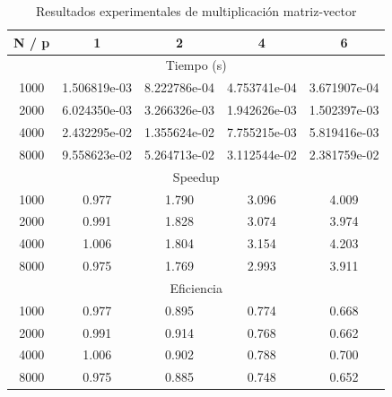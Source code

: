 \documentclass[12pt,a4paper]{article}
\begin{document}
\begin{table}[htbp]
\centering
\caption{Resultados experimentales de multiplicación matriz-vector}
\label{tab:matvec}
\begin{tabular}{ccccc}
\toprule
N / p & 1 & 2 & 4 & 6 \\
\midrule
\multicolumn{5}{c}{Tiempo (s)} \\
\midrule
1000 & 1.506819e-03 & 8.222786e-04 & 4.753741e-04 & 3.671907e-04 \\
2000 & 6.024350e-03 & 3.266326e-03 & 1.942626e-03 & 1.502397e-03 \\
4000 & 2.432295e-02 & 1.355624e-02 & 7.755215e-03 & 5.819416e-03 \\
8000 & 9.558623e-02 & 5.264713e-02 & 3.112544e-02 & 2.381759e-02 \\
\midrule
\multicolumn{5}{c}{Speedup} \\
\midrule
1000 & 0.977 & 1.790 & 3.096 & 4.009 \\
2000 & 0.991 & 1.828 & 3.074 & 3.974 \\
4000 & 1.006 & 1.804 & 3.154 & 4.203 \\
8000 & 0.975 & 1.769 & 2.993 & 3.911 \\
\midrule
\multicolumn{5}{c}{Eficiencia} \\
\midrule
1000 & 0.977 & 0.895 & 0.774 & 0.668 \\
2000 & 0.991 & 0.914 & 0.768 & 0.662 \\
4000 & 1.006 & 0.902 & 0.788 & 0.700 \\
8000 & 0.975 & 0.885 & 0.748 & 0.652 \\
\bottomrule
\end{tabular}
\end{table}
\end{document}
